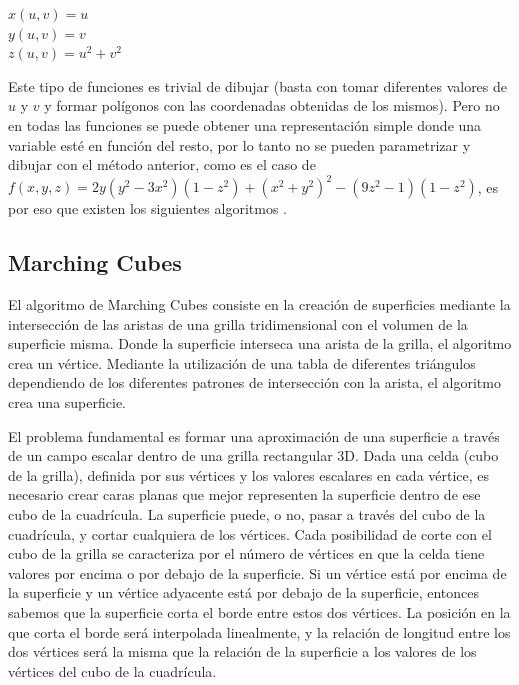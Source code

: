\documentclass[12pt]{article}
\begin{document}
\begin{center}
$x(u,v) = u$\\
$y(u,v) = v$\\
$z(u,v) = u^2+v^2$\\
\end{center}

Este tipo de funciones es trivial de dibujar (basta con tomar diferentes valores de $u$ y $v$ y formar polígonos con las coordenadas obtenidas de los mismos).
Pero no en todas las funciones se puede obtener una representación simple donde una variable esté en función del resto, por lo tanto no se pueden parametrizar y dibujar con el método anterior, como es el caso de  $f(x,y,z) = 2y(y^2-3x^2)(1-z^2)+(x^2+y^2)^2-(9z^2-1)(1-z^2)$, es por eso que existen los siguientes algoritmos \cite{implicitas}.

\subsection{Marching Cubes}
\noindent El algoritmo de Marching Cubes\cite{marching}\cite{marchingcubes} consiste en la creación de superficies mediante la intersección de las aristas de una grilla tridimensional con el volumen de la superficie misma. Donde la superficie interseca una arista de la grilla, el algoritmo crea un vértice. Mediante la utilización de una tabla de diferentes triángulos dependiendo de los diferentes patrones de intersección con la arista, el algoritmo crea una superficie.

El problema fundamental es formar una aproximación de una superficie a través de un campo escalar dentro de una grilla rectangular 3D. Dada una celda (cubo de la grilla), definida por sus vértices y los valores escalares en cada vértice, es necesario crear caras planas que mejor representen la superficie dentro de ese cubo de la cuadrícula. La superficie puede, o no, pasar a través del cubo de la cuadrícula, y cortar cualquiera de los vértices. Cada posibilidad de corte con el cubo de la grilla se caracteriza por el número de vértices en que la celda tiene valores por encima o por debajo de la superficie. Si un vértice está por encima de la superficie y un vértice adyacente está por debajo de la superficie, entonces sabemos que la superficie corta el borde entre estos dos vértices. La posición en la que corta el borde será interpolada linealmente, y la relación de longitud entre los dos vértices será la misma que la relación de la superficie a los valores de los vértices del cubo de la cuadrícula.
\end{document}
